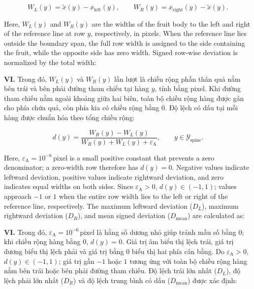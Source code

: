 \documentclass[final,1p,11pt,longtitle]{elsarticle}
\newenvironment{viet}{\par\smallskip\begingroup\color{viColor}\noindent\textbf{VI. }\ignorespaces}{\par\endgroup\smallskip}
\begin{document}
\begin{equation}
W_L(y)=\tilde{x}(y)-x_{\mathrm{left}}(y),\qquad W_R(y)=x_{\mathrm{right}}(y)-\tilde{x}(y).
\end{equation}

Here, $W_L(y)$ and $W_R(y)$ are the widths of the fruit body to the left and right of the reference line at row $y$, respectively, in pixels. When the reference line lies outside the boundary span, the full row width is assigned to the side containing the fruit, while the opposite side has zero width. Signed row-wise deviation is normalized by the total width:

\begin{viet}
Trong đó, $W_L(y)$ và $W_R(y)$ lần lượt là chiều rộng phần thân quả nằm bên trái và bên phải đường tham chiếu tại hàng $y$, tính bằng pixel. Khi đường tham chiếu nằm ngoài khoảng giữa hai biên, toàn bộ chiều rộng hàng được gán cho phía chứa quả, còn phía kia có chiều rộng bằng 0. Độ lệch có dấu tại mỗi hàng được chuẩn hóa theo tổng chiều rộng:
\end{viet}

\begin{equation}
d(y)=\frac{W_R(y)-W_L(y)}{W_R(y)+W_L(y)+\varepsilon_{\mathrm{A}}},\qquad y\in\mathcal{Y}_{\mathrm{spine}}.
\end{equation}

Here, $\varepsilon_{\mathrm{A}}=10^{-6}\,\mathrm{pixel}$ is a small positive constant that prevents a zero denominator; a zero-width row therefore has $d(y)=0$. Negative values indicate leftward deviation, positive values indicate rightward deviation, and zero indicates equal widths on both sides. Since $\varepsilon_{\mathrm{A}}>0$, $d(y)\in(-1,1)$; values approach $-1$ or $1$ when the entire row width lies to the left or right of the reference line, respectively. The maximum leftward deviation ($D_L$), maximum rightward deviation ($D_R$), and mean signed deviation ($D_{\mathrm{mean}}$) are calculated as:

\begin{viet}
Trong đó, $\varepsilon_{\mathrm{A}}=10^{-6}\,\mathrm{pixel}$ là hằng số dương nhỏ giúp tránh mẫu số bằng 0; khi chiều rộng hàng bằng 0, $d(y)=0$. Giá trị âm biểu thị lệch trái, giá trị dương biểu thị lệch phải và giá trị bằng 0 biểu thị hai phía cân bằng. Do $\varepsilon_{\mathrm{A}}>0$, $d(y)\in(-1,1)$; giá trị gần $-1$ hoặc $1$ tương ứng với toàn bộ chiều rộng hàng nằm bên trái hoặc bên phải đường tham chiếu. Độ lệch trái lớn nhất ($D_L$), độ lệch phải lớn nhất ($D_R$) và độ lệch trung bình có dấu ($D_{\mathrm{mean}}$) được xác định:
\end{viet}
\end{document}
